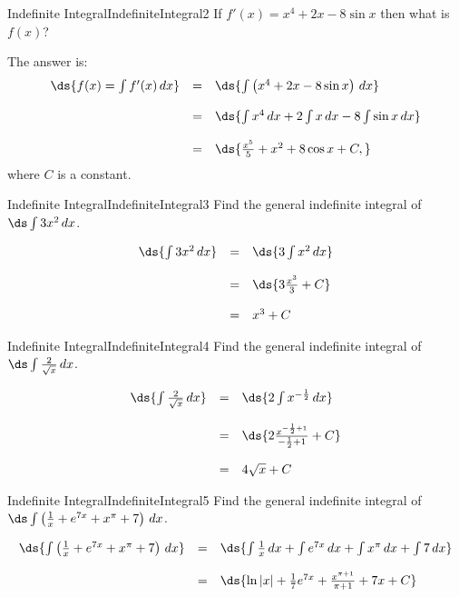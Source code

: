 \begin{example}{Indefinite Integral}{IndefiniteIntegral2}
If $f'(x)=x^4+2x-8\sin x$ then what is $f(x)$?
\end{example}

\begin{solution} 
The answer is:
$$\begin{array}{rcl}
\ds{f(x)=\int f'(x)\,dx}&=&\ds{\int \left(x^4+2x-8\sin x\right)\,dx}\\
\\
&=&\ds{ \int x^4 \,dx + 2\int x\,dx -8 \int \sin x\,dx }\\
\\
&=&\ds{\frac{x^5}{5}+x^2+8\cos x+C,}\\
\end{array}$$
where $C$ is a constant.
\end{solution}

\begin{example}{Indefinite Integral}{IndefiniteIntegral3}
Find the general indefinite integral of $\ds\int 3x^2\,dx$.
\end{example}
\begin{solution}
	$$\begin{array}{rcl}
	\ds{\int 3x^2\,dx} & = & \ds{3\int x^2\,dx}\\
	\\
	&=&\ds{3\frac{x^3}{3}+C}\\
	\\
	&=&x^3+C\\
	\end{array} $$
\end{solution}

\begin{example}{Indefinite Integral}{IndefiniteIntegral4}
Find the general indefinite integral of $\ds\int \frac{2}{\sqrt x}\,dx$.
\end{example}
\begin{solution}
	$$\begin{array}{rcl}
	\ds{\int \frac{2}{\sqrt x}\,dx} & = & \ds{2\int x^{-\frac{1}{2}}\,dx}\\
	\\
	&=&\ds{2\frac{x^{-\frac{1}{2}+1}}{-\frac{1}{2}+1}+C}\\
	\\
	&=&4\sqrt x+C\\
	\end{array}$$
\end{solution}

\begin{example}{Indefinite Integral}{IndefiniteIntegral5}
Find the general indefinite integral of $\ds\int \left(\frac{1}{x}+e^{7x}+x^\pi+7\right)\,dx$.
\end{example}
\begin{solution}
	$$\begin{array}{rcl}
	\ds{\int \left(\frac{1}{x}+e^{7x}+x^\pi+7\right)\,dx} & = & \ds{\int \frac{1}{x}\,dx+\int e^{7x}\,dx+\int x^\pi\,dx+\int 7\,dx}\\
	\\
	&=& \ds{\ln|x|+\frac{1}{7}e^{7x}+\frac{x^{\pi+1}}{\pi+1}+7x+C}\\
	\end{array}$$
\end{solution}

